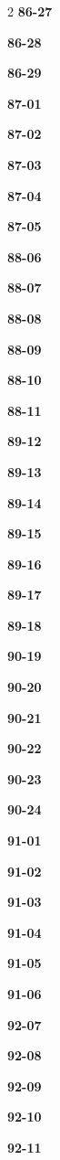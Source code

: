 \documentclass[10pt,a4paper]{article}
\begin{document}
\begin{multicols}{2}
\noindent\textbf{86-27}\ \par
\noindent\textbf{86-28}\ \par
\noindent\textbf{86-29}\ \par
\noindent\textbf{87-01}\ \par
\noindent\textbf{87-02}\ \par
\noindent\textbf{87-03}\ \par
\noindent\textbf{87-04}\ \par
\noindent\textbf{87-05}\ \par
\noindent\textbf{88-06}\ \par
\noindent\textbf{88-07}\ \par
\noindent\textbf{88-08}\ \par
\noindent\textbf{88-09}\ \par
\noindent\textbf{88-10}\ \par
\noindent\textbf{88-11}\ \par
\noindent\textbf{89-12}\ \par
\noindent\textbf{89-13}\ \par
\noindent\textbf{89-14}\ \par
\noindent\textbf{89-15}\ \par
\noindent\textbf{89-16}\ \par
\noindent\textbf{89-17}\ \par
\noindent\textbf{89-18}\ \par
\noindent\textbf{90-19}\ \par
\noindent\textbf{90-20}\ \par
\noindent\textbf{90-21}\ \par
\noindent\textbf{90-22}\ \par
\noindent\textbf{90-23}\ \par
\noindent\textbf{90-24}\ \par
\noindent\textbf{91-01}\ \par
\noindent\textbf{91-02}\ \par
\noindent\textbf{91-03}\ \par
\noindent\textbf{91-04}\ \par
\noindent\textbf{91-05}\ \par
\noindent\textbf{91-06}\ \par
\noindent\textbf{92-07}\ \par
\noindent\textbf{92-08}\ \par
\noindent\textbf{92-09}\ \par
\noindent\textbf{92-10}\ \par
\noindent\textbf{92-11}\ \par

\end{multicols}
\end{document}
